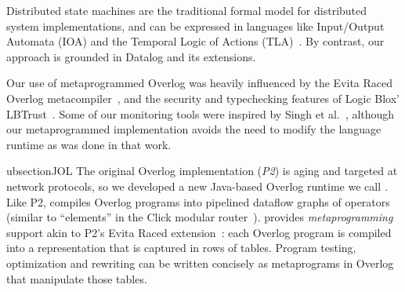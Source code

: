 
Distributed state machines are the traditional formal model for distributed system implementations, and can be expressed in languages like Input/Output Automata (IOA) and the Temporal Logic of Actions (TLA)~\cite{lynchbook}.  By contrast, our approach is grounded in Datalog and its extensions.  %

Our use of metaprogrammed Overlog was heavily influenced by the Evita Raced
Overlog metacompiler~\cite{evitaraced}, and the security and typechecking
features of Logic Blox' LBTrust~\cite{lbtrust}.  Some of our monitoring tools
were inspired by Singh et al.~\cite{singh-eurosys}, although our metaprogrammed
implementation avoids the need to modify the language runtime as was done in that work.

ubsection{JOL}
The original Overlog implementation (\emph{P2}) is aging and targeted at network
protocols, so we developed a new Java-based Overlog runtime we call \emph{\JOL.}
Like P2, \JOL compiles Overlog programs into pipelined dataflow graphs of
operators (similar to ``elements'' in the Click modular router~\cite{click}).
\JOL provides \emph{metaprogramming} support akin to P2's Evita Raced
extension~\cite{evitaraced}: each Overlog program is compiled into a
representation that is captured in rows of tables.  Program testing,
optimization and rewriting can be written concisely as metaprograms in Overlog
that manipulate those tables.

